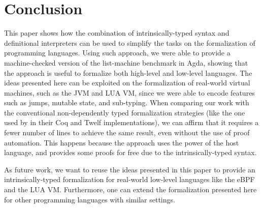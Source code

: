 \documentclass[sigconf]{acmart}
\theoremstyle{definition}
\begin{document}
\vspace{-3ex}

\section{Conclusion}\label{sec:conclusion}
 
This paper shows how the combination of intrinsically-typed syntax and definitional interpreters can be used to simplify
the tasks on the formalization of programming languages. Using such approach, we were able to provide a machine-checked version of the
list-machine benchmark in Agda, showing that the approach is useful to formalize both high-level and low-level languages.
The ideas presented here can be exploited on the formalization of real-world virtual machines, such as the JVM and LUA VM,
since we were able to encode features such as jumps, mutable state, and sub-typing. When comparing our work with the
conventional non-dependently typed formalization strategies (like the one used by \citet{Appel07} in their Coq and Twelf implementations),
we can affirm that it requires a fewer number of lines to achieve the same result, even without the use of proof automation.
This happens because the approach uses the power of the host language, and provides some proofs for free due to the
intrinsically-typed syntax.

As future work, we want to reuse the ideas presented in this paper to provide an intrinsically-typed formalization for
real-world low-level languages like the eBPF and the LUA VM. Furthermore, one can extend the formalization presented here
for other programming languages with similar settings.



\end{document}

